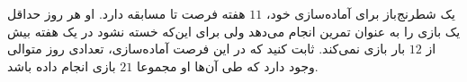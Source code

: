 \EXERCISE
یک شطرنج‌باز برای آماده‌سازی خود، $11$ هفته فرصت تا مسابقه دارد. او هر روز حداقل یک بازی را به عنوان تمرین انجام می‌دهد ولی برای این‌که خسته نشود در یک هفته بیش از
$12$
بار بازی نمی‌کند. ثابت کنید که در این فرصت آماده‌سازی، تعدادی روز متوالی وجود دارد که طی آن‌ها او مجموعا
$21$
بازی انجام داده باشد.